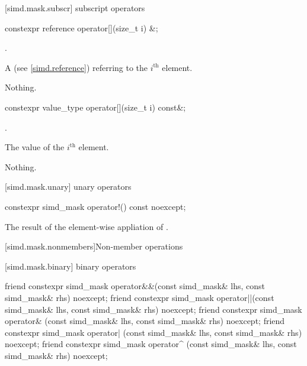[simd.mask.subscr]{\texorpdfstring{ subscript}{simd_mask subscript} operators}

\begin{itemdecl}
constexpr reference operator[](size_t i) &;
\end{itemdecl}

\begin{itemdescr}
  \pnum\requires
  .

  \pnum\returns
  A  (see \ref{simd.reference}) referring to the $i^\text{th}$ element.

  \pnum\throws Nothing.
\end{itemdescr}

\begin{itemdecl}
constexpr value_type operator[](size_t i) const&;
\end{itemdecl}

\begin{itemdescr}
  \pnum\requires
  .

  \pnum\returns
  The value of the $i^\text{th}$ element.

  \pnum\throws Nothing.
\end{itemdescr}

[simd.mask.unary]{\texorpdfstring{ unary}{simd_mask unary} operators}

\begin{itemdecl}
constexpr simd_mask operator!() const noexcept;
\end{itemdecl}

\begin{itemdescr}
  \pnum\returns
  The result of the element-wise appliation of .
\end{itemdescr}

[simd.mask.nonmembers]{Non-member operations}

[simd.mask.binary]{\texorpdfstring{ binary}{simd_mask binary} operators}

\begin{itemdecl}
friend constexpr simd_mask operator&&(const simd_mask& lhs, const simd_mask& rhs) noexcept;
friend constexpr simd_mask operator||(const simd_mask& lhs, const simd_mask& rhs) noexcept;
friend constexpr simd_mask operator& (const simd_mask& lhs, const simd_mask& rhs) noexcept;
friend constexpr simd_mask operator| (const simd_mask& lhs, const simd_mask& rhs) noexcept;
friend constexpr simd_mask operator^ (const simd_mask& lhs, const simd_mask& rhs) noexcept;
\end{itemdecl}

